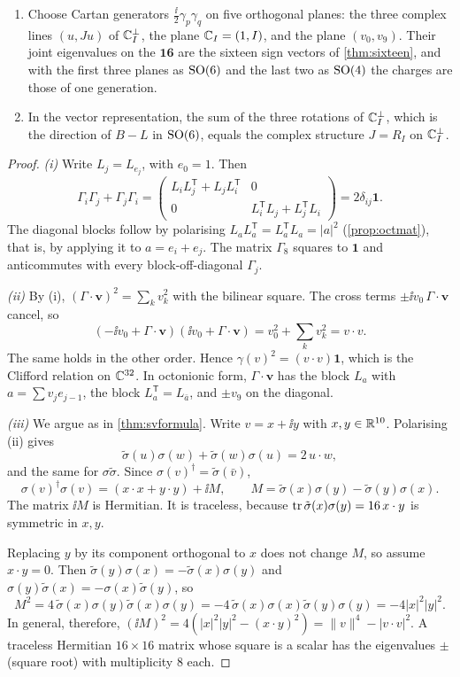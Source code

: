 \begin{theorem}
\begin{enumerate}[label=(\roman*)]
\item Choose Cartan generators $\frac\ii2\gamma_p\gamma_q$ on five orthogonal planes: the three complex lines $(u,Ju)$ of $\mathbb{C}_I^\perp$, the plane $\mathbb{C}_I=(1,I)$, and the plane $(v_0,v_9)$. Their joint eigenvalues on the $\mathbf{16}$ are the sixteen sign vectors of \cref{thm:sixteen}, and with the first three planes as $\mathrm{SO}(6)$ and the last two as $\mathrm{SO}(4)$ the charges are those of one generation.
\item In the vector representation, the sum of the three rotations of $\mathbb{C}_I^\perp$, which is the direction of $B-L$ in $\mathrm{SO}(6)$, equals the complex structure $J=R_I$ on $\mathbb{C}_I^\perp$.
\end{enumerate}
\end{theorem}
\begin{proof}
\emph{(i)} Write $L_j=L_{e_j}$, with $e_0=1$. Then
\[
\Gamma_i\Gamma_j+\Gamma_j\Gamma_i=\begin{pmatrix}L_iL_j^{\mathsf T}+L_jL_i^{\mathsf T}&0\\0&L_i^{\mathsf T}L_j+L_j^{\mathsf T}L_i\end{pmatrix}=2\delta_{ij}\mathbf 1 .
\]
The diagonal blocks follow by polarising $L_aL_a^{\mathsf T}=L_a^{\mathsf T}L_a=|a|^2$ (\cref{prop:octmat}), that is, by applying it to $a=e_i+e_j$. The matrix $\Gamma_8$ squares to $\mathbf 1$ and anticommutes with every block-off-diagonal $\Gamma_j$.

\emph{(ii)} By (i), $(\Gamma\cdot\mathbf v)^2=\sum_kv_k^2$ with the bilinear square. The cross terms $\pm\ii v_0\,\Gamma\cdot\mathbf v$ cancel, so
\[
(-\ii v_0+\Gamma\cdot\mathbf v)(\ii v_0+\Gamma\cdot\mathbf v)=v_0^2+\textstyle\sum_kv_k^2=v\cdot v .
\]
The same holds in the other order. Hence $\gamma(v)^2=(v\cdot v)\mathbf 1$, which is the Clifford relation on $\mathbb{C}^{32}$. In octonionic form, $\Gamma\cdot\mathbf v$ has the block $L_a$ with $a=\sum v_je_{j-1}$, the block $L_a^{\mathsf T}=L_{\bar a}$, and $\pm v_9$ on the diagonal.

\emph{(iii)} We argue as in \cref{thm:svformula}. Write $v=x+\ii y$ with $x,y\in\mathbb{R}^{10}$. Polarising (ii) gives
\[
\tilde\sigma(u)\sigma(w)+\tilde\sigma(w)\sigma(u)=2\,u\cdot w ,
\]
and the same for $\sigma\tilde\sigma$. Since $\sigma(v)^\dagger=\tilde\sigma(\bar v)$,
\[
\sigma(v)^\dagger\sigma(v)=(x\cdot x+y\cdot y)+\ii M,\qquad M=\tilde\sigma(x)\sigma(y)-\tilde\sigma(y)\sigma(x).
\]
The matrix $\ii M$ is Hermitian. It is traceless, because $\operatorname{tr}\tilde\sigma(x)\sigma(y)=16\,x\cdot y$ is symmetric in $x,y$.

Replacing $y$ by its component orthogonal to $x$ does not change $M$, so assume $x\cdot y=0$. Then $\tilde\sigma(y)\sigma(x)=-\tilde\sigma(x)\sigma(y)$ and $\sigma(y)\tilde\sigma(x)=-\sigma(x)\tilde\sigma(y)$, so
\[
M^2=4\,\tilde\sigma(x)\sigma(y)\tilde\sigma(x)\sigma(y)=-4\,\tilde\sigma(x)\sigma(x)\tilde\sigma(y)\sigma(y)=-4|x|^2|y|^2 .
\]
In general, therefore, $(\ii M)^2=4(|x|^2|y|^2-(x\cdot y)^2)=\|v\|^4-|v\cdot v|^2$. A traceless Hermitian $16\times16$ matrix whose square is a scalar has the eigenvalues $\pm$ (square root) with multiplicity $8$ each.


\end{proof}
